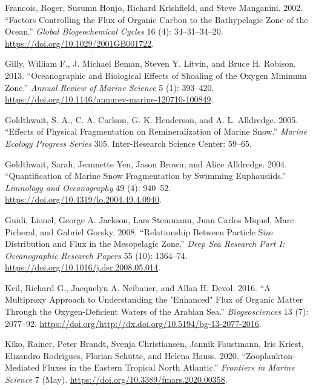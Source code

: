 \documentclass[]{article}
\begin{document}
\leavevmode\hypertarget{ref-francoisFactorsControllingFlux2002}{}%
Francois, Roger, Susumu Honjo, Richard Krishfield, and Steve Manganini.
2002. ``Factors Controlling the Flux of Organic Carbon to the
Bathypelagic Zone of the Ocean.'' \emph{Global Biogeochemical Cycles} 16
(4): 34--31--34--20. \url{https://doi.org/10.1029/2001GB001722}.

\leavevmode\hypertarget{ref-gillyOceanographicBiologicalEffects2013}{}%
Gilly, William F., J. Michael Beman, Steven Y. Litvin, and Bruce H.
Robison. 2013. ``Oceanographic and Biological Effects of Shoaling of the
Oxygen Minimum Zone.'' \emph{Annual Review of Marine Science} 5 (1):
393--420. \url{https://doi.org/10.1146/annurev-marine-120710-100849}.

\leavevmode\hypertarget{ref-goldthwaitEffectsPhysicalFragmentation2005}{}%
Goldthwait, S. A., C. A. Carlson, G. K. Henderson, and A. L. Alldredge.
2005. ``Effects of Physical Fragmentation on Remineralization of Marine
Snow.'' \emph{Marine Ecology Progress Series} 305. Inter-Research
Science Center: 59--65.

\leavevmode\hypertarget{ref-goldthwaitQuantificationMarineSnow2004}{}%
Goldthwait, Sarah, Jeannette Yen, Jason Brown, and Alice Alldredge.
2004. ``Quantification of Marine Snow Fragmentation by Swimming
Euphausiids.'' \emph{Limnology and Oceanography} 49 (4): 940--52.
\url{https://doi.org/10.4319/lo.2004.49.4.0940}.

\leavevmode\hypertarget{ref-guidiRelationshipParticleSize2008}{}%
Guidi, Lionel, George A. Jackson, Lars Stemmann, Juan Carlos Miquel,
Marc Picheral, and Gabriel Gorsky. 2008. ``Relationship Between Particle
Size Distribution and Flux in the Mesopelagic Zone.'' \emph{Deep Sea
Research Part I: Oceanographic Research Papers} 55 (10): 1364--74.
\url{https://doi.org/10.1016/j.dsr.2008.05.014}.

\leavevmode\hypertarget{ref-keilMultiproxyApproachUnderstanding2016}{}%
Keil, Richard G., Jacquelyn A. Neibauer, and Allan H. Devol. 2016. ``A
Multiproxy Approach to Understanding the "Enhanced" Flux of Organic
Matter Through the Oxygen-Deficient Waters of the Arabian Sea.''
\emph{Biogeosciences} 13 (7): 2077--92.
\url{https://doi.org/http://dx.doi.org/10.5194/bg-13-2077-2016}.

\leavevmode\hypertarget{ref-kikoZooplanktonMediatedFluxesEastern2020}{}%
Kiko, Rainer, Peter Brandt, Svenja Christiansen, Jannik Faustmann, Iris
Kriest, Elizandro Rodrigues, Florian Schütte, and Helena Hauss. 2020.
``Zooplankton-Mediated Fluxes in the Eastern Tropical North Atlantic.''
\emph{Frontiers in Marine Science} 7 (May).
\url{https://doi.org/10.3389/fmars.2020.00358}.
\end{document}
